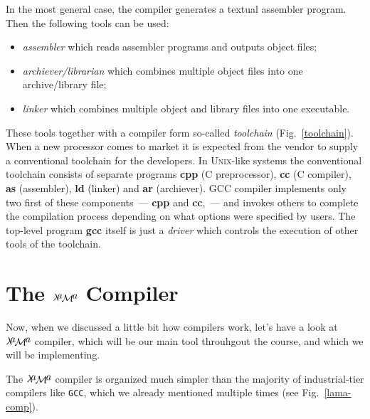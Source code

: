 \documentclass{book}
\newcommand{\lama}{$\lambda\kern -.1667em\lower -.5ex\hbox{$a$}\kern -.1000em\lower .2ex\hbox{$\mathcal M$}\kern -.1000em\lower -.5ex\hbox{$a$}$\xspace}
\newcommand{\lang}[1]{\textsc{#1}}
\newcommand{\sys}[1]{\textsc{#1}}
\newcommand{\prog}[1]{\textbf{#1}}
\begin{document}
In the most general case, the compiler generates a textual assembler program. Then the following tools can be used:

\FloatBarrier

\begin{itemize}
\item \emph{assembler} which reads assembler programs and outputs object files;
\item \emph{archiever/librarian} which combines multiple object files into one archive/library file;
\item \emph{linker} which combines multiple object and library files into one executable.
\end{itemize}

These tools together with a compiler form so-called \emph{toolchain} (Fig.~\ref{toolchain}). When a new processor comes to market it is expected from
the vendor to supply a conventional toolchain for the developers. In \sys{Unix}-like systems the conventional
toolchain consists of separate programs \prog{cpp} (\lang{C} preprocessor), \prog{cc} (\lang{C} compiler),
\prog{as} (assembler), \prog{ld} (linker) and \prog{ar} (archiever). \sys{GCC} compiler implements only two first
of these components~--- \prog{cpp} and \prog{cc},~--- and invokes others to complete the compilation process
depending on what options were specified by users. The top-level program \prog{gcc} itself is just a \emph{driver}
which controls the execution of other tools of the toolchain. 

\section{The \lama Compiler}

Now, when we discussed a little bit how compilers work, let's have a look at \lama compiler, which will be our main
tool throuhgout the course, and which we will be implementing.

The \lama compiler is organized much simpler than the majority of industrial-tier compilers like \texttt{GCC}, which we already
mentioned multiple times (see Fig.~\ref{lama-comp}).
\end{document}
